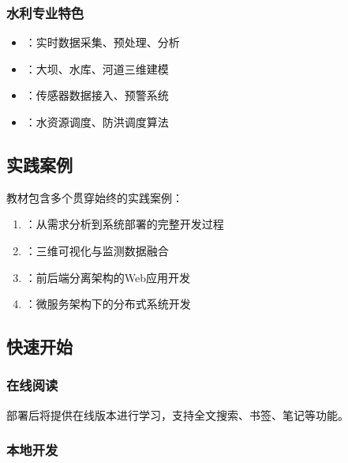 \hypertarget{ux6c34ux5229ux4e13ux4e1aux7279ux8272}{%
\subsubsection{水利专业特色}\label{ux6c34ux5229ux4e13ux4e1aux7279ux8272}}

\begin{itemize}
\tightlist
\item
  ：实时数据采集、预处理、分析
\item
  ：大坝、水库、河道三维建模
\item
  ：传感器数据接入、预警系统
\item
  ：水资源调度、防洪调度算法
\end{itemize}

\hypertarget{ux5b9eux8df5ux6848ux4f8b}{%
\subsection{实践案例}\label{ux5b9eux8df5ux6848ux4f8b}}

教材包含多个贯穿始终的实践案例：

\begin{enumerate}
\def\labelenumi{\arabic{enumi}.}
\tightlist
\item
  ：从需求分析到系统部署的完整开发过程
\item
  ：三维可视化与监测数据融合
\item
  ：前后端分离架构的Web应用开发
\item
  ：微服务架构下的分布式系统开发
\end{enumerate}

\hypertarget{ux5febux901fux5f00ux59cb}{%
\subsection{快速开始}\label{ux5febux901fux5f00ux59cb}}

\hypertarget{ux5728ux7ebfux9605ux8bfb}{%
\subsubsection{在线阅读}\label{ux5728ux7ebfux9605ux8bfb}}

部署后将提供在线版本进行学习，支持全文搜索、书签、笔记等功能。

\hypertarget{ux672cux5730ux5f00ux53d1}{%
\subsubsection{本地开发}\label{ux672cux5730ux5f00ux53d1}}

